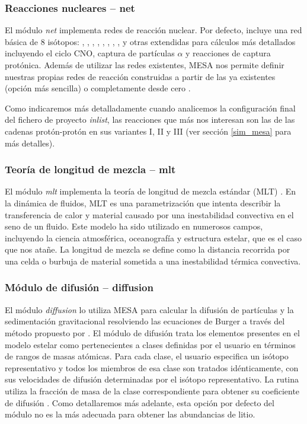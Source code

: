 \subsubsection{Reacciones nucleares – net} \label{reac_nuc}
El módulo \textit{net} implementa redes de reacción nuclear. Por defecto, incluye una red básica de 8 isótopos: , , , , , , , , y otras extendidas para cálculos más detallados incluyendo el ciclo CNO, captura de partículas $\alpha$ y reacciones de captura protónica. Además de utilizar las redes existentes, MESA nos permite definir nuestras propias redes de reacción construidas a partir de las ya existentes (opción más sencilla) o completamente desde cero \cite{Paxton2011}.\par

Como indicaremos más detalladamente cuando analicemos la configuración final del fichero de proyecto \textit{inlist}, las reacciones que más nos interesan son las de las cadenas protón-protón en sus variantes I, II y III (ver sección \ref{sim_mesa} para más detalles).\par

\subsubsection{Teoría de longitud de mezcla – mlt}
El módulo \textit{mlt} implementa la teoría de longitud de mezcla estándar (MLT) \citep{Paxton2011}. En la dinámica de fluidos, MLT es una parametrización que intenta describir la transferencia de calor y material causado por una inestabilidad convectiva en el seno de un fluido. Este modelo ha sido utilizado en numerosos campos, incluyendo la ciencia atmosférica, oceanografía y estructura estelar, que es el caso que nos atañe. La longitud de mezcla se define como la distancia recorrida por una celda o burbuja de material sometida a una inestabilidad térmica convectiva.\par

\subsubsection{Módulo de difusión – diffusion} \label{subsec_diffusion}
El módulo \textit{diffusion} lo utiliza MESA para calcular la difusión de partículas y la sedimentación gravitacional resolviendo las ecuaciones de Burger \citep{Burgers1969} a través del método propuesto por \cite{Thoul1993}. El módulo de difusión trata los elementos presentes en el modelo estelar como pertenecientes a clases definidas por el usuario en términos de rangos de masas atómicas. Para cada clase, el usuario especifica un isótopo representativo y todos los miembros de esa clase son tratados idénticamente, con sus velocidades de difusión determinadas por el isótopo representativo. La rutina utiliza la fracción de masa de la clase correspondiente para obtener su coeficiente de difusión \citep{Paxton2015}. Como detallaremos más adelante, esta opción por defecto del módulo no es la más adecuada para obtener las abundancias de litio.\par

